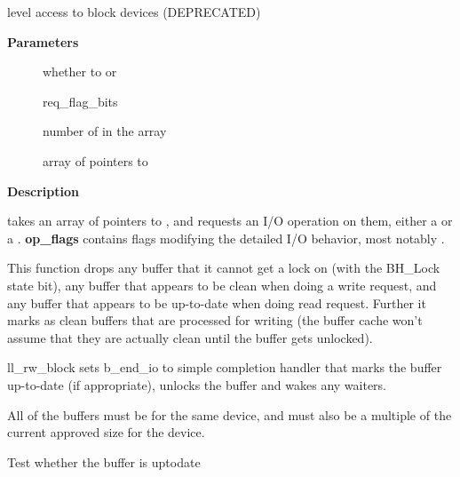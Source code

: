\documentclass[a4paper,8pt,english]{sphinxmanual}
\begin{document}
\begin{fulllineitems}
\label{filesystems/index:c.ll_rw_block}
level access to block devices (DEPRECATED)

\end{fulllineitems}


\textbf{Parameters}
\begin{description}
\item[{}] \leavevmode
whether to  or 

\item[{}] \leavevmode
req\_flag\_bits

\item[{}] \leavevmode
number of  in the array

\item[{}] \leavevmode
array of pointers to 

\end{description}

\textbf{Description}

{\hyperref[filesystems/index:c.ll_rw_block]{\emph{}}} takes an array of pointers to , and
requests an I/O operation on them, either a  or a .
\textbf{op\_flags} contains flags modifying the detailed I/O behavior, most notably
.

This function drops any buffer that it cannot get a lock on (with the
BH\_Lock state bit), any buffer that appears to be clean when doing a write
request, and any buffer that appears to be up-to-date when doing read
request.  Further it marks as clean buffers that are processed for
writing (the buffer cache won't assume that they are actually clean
until the buffer gets unlocked).

ll\_rw\_block sets b\_end\_io to simple completion handler that marks
the buffer up-to-date (if appropriate), unlocks the buffer and wakes
any waiters.

All of the buffers must be for the same device, and must also be a
multiple of the current approved size for the device.

\begin{fulllineitems}
\label{filesystems/index:c.bh_uptodate_or_lock}
Test whether the buffer is uptodate

\end{fulllineitems}
\end{document}
